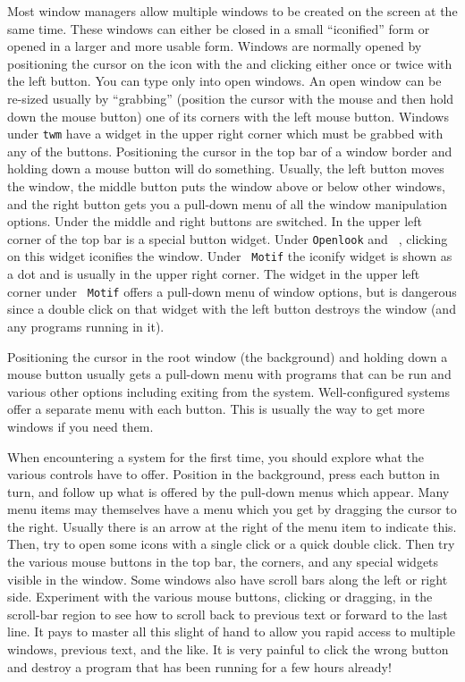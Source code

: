      Most window managers allow multiple windows to be created on the
screen at the same time.  These windows can either be closed in a small
``iconified'' form or opened in a larger and more usable form.
Windows are normally opened by positioning the cursor on the icon with
the  and clicking either once or twice with the left
button.  You can type only into open windows.  An open window can be
re-sized usually by ``grabbing'' (position the cursor with the mouse
and then hold down the mouse button) one of its corners with the left
mouse button.  Windows under {\tt twm} have a widget in the upper
right corner which must be grabbed with any of the buttons.
Positioning the cursor in the top bar of a window border and holding
down a mouse button will do something.  Usually, the left button moves
the window, the middle button puts the window above or below other
windows, and the right button gets you a pull-down menu of all the
window manipulation options.  Under {\tt {}} the middle and
right buttons are switched.  In the upper left corner of the top bar
is a special button widget.  Under {\tt Openlook} and {\tt
{}}, clicking on this widget iconifies the window.  Under {\tt
Motif} the iconify widget is shown as a dot and is usually in the
upper right corner.  The widget in the upper left corner under {\tt
Motif} offers a pull-down menu of window options, but is dangerous
since a double click on that widget with the left button destroys the
window (and any programs running in it).

     Positioning the cursor in the root window (the background) and
holding down a mouse button usually gets a pull-down menu with
programs that can be run and various other options including exiting
from the system.  Well-configured systems offer a separate menu with
each button.  This is usually the way to get more windows if you need
them.

     When encountering a system for the first time, you should explore
what the various controls have to offer.  Position in the background,
press each button in turn, and follow up what is offered by the
pull-down menus which appear.  Many menu items may themselves have a
menu which you get by dragging the cursor to the right.  Usually there
is an arrow at the right of the menu item to indicate this.  Then, try
to open some icons with a single click or a quick double click.  Then
try the various mouse buttons in the top bar, the corners, and any
special widgets visible in the window.  Some windows also have scroll
bars along the left or right side.  Experiment with the various mouse
buttons, clicking or dragging, in the scroll-bar region to see how to
scroll back to previous text or forward to the last line.  It pays to
master all this slight of hand to allow you rapid access to multiple
windows, previous text, and the like.  It is very painful to click the
wrong button and destroy a program that has been running for a few
hours already!

